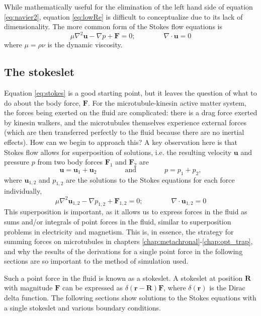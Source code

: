 \documentclass[11pt]{ucthesis}
\begin{document}
While mathematically useful for the elimination of the left hand side of equation \ref{eq:navier2}, equation \ref{eq:lowRe} is difficult to conceptualize due to its lack of dimensionality. The more common form of the Stokes flow equations is
\begin{equation}
\label{eq:stokes}
\mu\nabla^2\mathbf{u} - \nabla p + \mathbf{F} = 0; \qquad\qquad \nabla\cdot\mathbf{u} = 0
\end{equation}
where $\mu = \rho \nu$ is the dynamic viscosity.

\subsection{The stokeslet}

Equation \ref{eq:stokes} is a good starting point, but it leaves the question of what to do about the body force, $\mathbf{F}$. For the microtubule-kinesin active matter system, the forces being exerted on the fluid are complicated: there is a drag force exerted by kinesin walkers, and the microtubules themselves experience external forces (which are then transferred perfectly to the fluid because there are no inertial effects). How can we begin to approach this? A key observation here is that Stokes flow allows for superposition of solutions, i.e. the resulting velocity $\mathbf{u}$ and pressure $p$ from two body forces $\mathbf{F}_1$ and $\mathbf{F}_2$ are
\begin{equation}
\mathbf{u} = \mathbf{u}_1 + \mathbf{u}_2\qquad\qquad\text{and} \qquad\qquad p = p_1+p_2,
\end{equation}
where $\mathbf{u}_{1,2}$ and $p_{1,2}$ are the solutions to the Stokes equations for each force individually,
\begin{equation}
\mu\nabla^2\mathbf{u}_{1,2} - \nabla p_{1,2} + \mathbf{F}_{1,2} = 0; \qquad\qquad \nabla\cdot\mathbf{u}_{1,2} = 0
\end{equation}
This superposition is important, as it allows us to express forces in the fluid as sums and/or integrals of point forces in the fluid, similar to superposition problems in electricity and magnetism. This is, in essence, the strategy for summing forces on microtubules in chapters \ref{chap:metachronal}-\ref{chap:opt_trap}, and why the results of the derivations for a single point force in the following sections are so important to the method of simulation used.

Such a point force in the fluid is known as a stokeslet. A stokeslet at position $\mathbf{R}$ with magnitude $\mathbf{F}$ can be expressed as $\delta(\mathbf{r}-\mathbf{R})\mathbf{F}$, where $\delta(\mathbf{r})$ is the Dirac delta function. The following sections show solutions to the Stokes equations with a single stokeslet and various boundary conditions.
\end{document}
